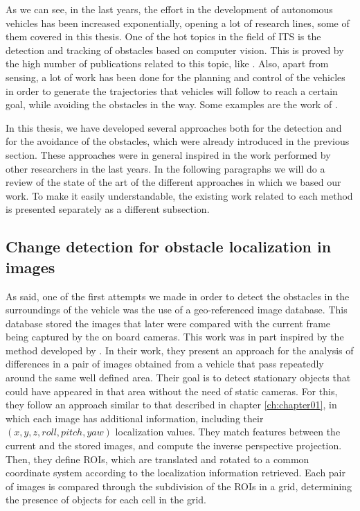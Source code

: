 As we can see, in the last years, the effort in the development of autonomous vehicles has been increased exponentially, opening a lot of research lines, some of them covered in this thesis. One of the hot topics in the field of \ac{ITS} is the detection and tracking of obstacles based on computer vision. This is proved by the high number of publications related to this topic, like \cite{Broggi2006, Broggi2010, primdahl2005change, Scharstein2002, Morales2011, Geiger2012, Steingrube2009, Morales2012, Morales2009, badino2009stixel, gunyel2012stixels, danescu2012particle, broggi2013}.
Also, apart from sensing, a lot of work has been done for the planning and control of the vehicles in order to generate the trajectories that vehicles will follow to reach a certain goal, while avoiding the obstacles in the way. Some examples are the work of \cite{werling2010optimal, thrun2006stanley, chu2012local}.

In this thesis, we have developed several approaches both for the detection and for the avoidance of the obstacles, which were already introduced in the previous section. These approaches were in general inspired in the work performed by other researchers in the last years. In the following paragraphs we will do a review of the state of the art of the different approaches in which we based our work. To make it easily understandable, the existing work related to each method is presented separately as a different subsection.

\subsection{Change detection for obstacle localization in images}\label{ch:chapter00_02_01}

As said, one of the first attempts we made in order to detect the obstacles in the surroundings of the vehicle was the use of a geo-referenced image database. This database stored the images that later were compared with the current frame being captured by the on board cameras. This work was in part inspired by the method developed by \cite{primdahl2005change}. In their work, they present an approach for the analysis of differences in a pair of images obtained from a vehicle that pass repeatedly around the same well defined area. Their goal is to detect stationary objects that could have appeared in that area without the need of static cameras. For this, they follow an approach similar to that described in chapter \ref{ch:chapter01}, in which each image has additional information, including their $(x, y, z, roll, pitch, yaw)$ localization values. They match features between the current and the stored images, and compute the inverse perspective projection. Then, they define \acp{ROI}, which are translated and rotated to a common coordinate system according to the localization information retrieved. Each pair of images is compared through the subdivision of the \acp{ROI} in a grid, determining the presence of objects for each cell in the grid.

